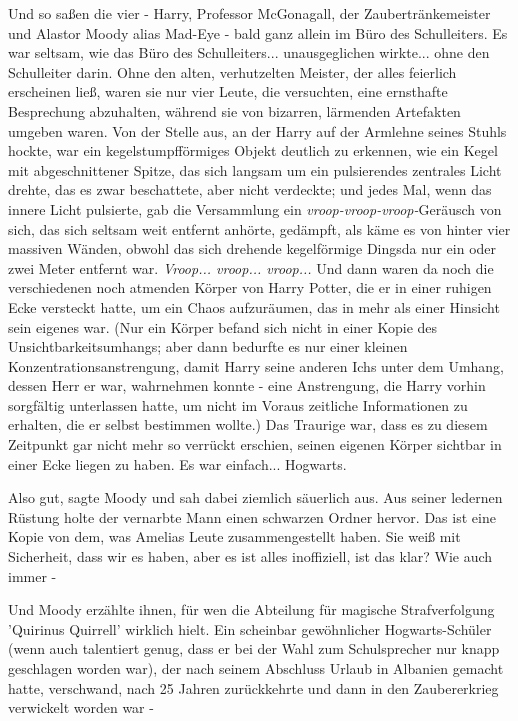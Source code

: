 Und so saßen die vier - Harry, Professor McGonagall, der Zaubertränkemeister und
Alastor Moody alias \glqq{}Mad-Eye\grqq{} - bald ganz allein im Büro des
Schulleiters. Es war seltsam, wie das Büro des Schulleiters... unausgeglichen
wirkte... ohne den Schulleiter darin. Ohne den alten, verhutzelten Meister, der
alles feierlich erscheinen ließ, waren sie nur vier Leute, die versuchten, eine
ernsthafte Besprechung abzuhalten, während sie von bizarren, lärmenden
Artefakten umgeben waren. Von der Stelle aus, an der Harry auf der Armlehne
seines Stuhls hockte, war ein kegelstumpfförmiges Objekt deutlich zu erkennen,
wie ein Kegel mit abgeschnittener Spitze, das sich langsam um ein pulsierendes
zentrales Licht drehte, das es zwar beschattete, aber nicht verdeckte; und jedes
Mal, wenn das innere Licht pulsierte, gab die Versammlung ein
\emph{vroop-vroop-vroop-}Geräusch von sich, das sich seltsam weit entfernt
anhörte, gedämpft, als käme es von hinter vier massiven Wänden, obwohl das sich
drehende kegelförmige Dingsda nur ein oder zwei Meter entfernt war.
\emph{Vroop... vroop... vroop...} Und dann waren da noch die verschiedenen noch
atmenden Körper von Harry Potter, die er in einer ruhigen Ecke versteckt hatte,
um ein Chaos aufzuräumen, das in mehr als einer Hinsicht sein eigenes war. (Nur
ein Körper befand sich nicht in einer Kopie des Unsichtbarkeitsumhangs; aber
dann bedurfte es nur einer kleinen Konzentrationsanstrengung, damit Harry seine
anderen Ichs unter dem Umhang, dessen Herr er war, wahrnehmen konnte - eine
Anstrengung, die Harry vorhin sorgfältig unterlassen hatte, um nicht im Voraus
zeitliche Informationen zu erhalten, die er selbst bestimmen wollte.) Das
Traurige war, dass es zu diesem Zeitpunkt gar nicht mehr so verrückt erschien,
seinen eigenen Körper sichtbar in einer Ecke liegen zu haben. Es war einfach...
Hogwarts.

\glqq{}Also gut\grqq{}, sagte Moody und sah dabei ziemlich säuerlich aus. Aus
seiner ledernen Rüstung holte der vernarbte Mann einen schwarzen Ordner hervor.
\glqq{}Das ist eine Kopie von dem, was Amelias Leute zusammengestellt haben. Sie
weiß mit Sicherheit, dass wir es haben, aber es ist alles inoffiziell, ist das
klar? Wie auch immer -\grqq{}

Und Moody erzählte ihnen, für wen die Abteilung für magische Strafverfolgung
'Quirinus Quirrell' wirklich hielt. Ein scheinbar gewöhnlicher Hogwarts-Schüler
(wenn auch talentiert genug, dass er bei der Wahl zum Schulsprecher nur knapp
geschlagen worden war), der nach seinem Abschluss Urlaub in Albanien gemacht
hatte, verschwand, nach 25 Jahren zurückkehrte und dann in den Zaubererkrieg
verwickelt worden war -

